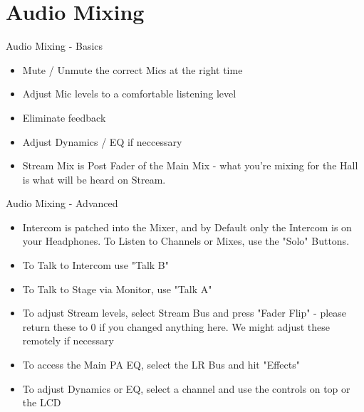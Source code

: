 \documentclass[aspectratio=169]{beamer}
\begin{document}
\section{Audio Mixing}

\begin{frame}{Audio Mixing - Basics}
	\begin{itemize}
		\item Mute / Unmute the correct Mics at the right time
		\item Adjust Mic levels to a comfortable listening level
		\item Eliminate feedback
		\item Adjust Dynamics / EQ if neccessary
		\item Stream Mix is Post Fader of the Main Mix - what you're mixing for the Hall is what will be heard on Stream.
	\end{itemize}
\end{frame}


\begin{frame}{Audio Mixing - Advanced}
	\begin{itemize}
		\item Intercom is patched into the Mixer, and by Default only the Intercom is on your Headphones. To Listen to Channels or Mixes, use the "Solo" Buttons.
		\item To Talk to Intercom use "Talk B"
		\item To Talk to Stage via Monitor, use "Talk A"
		\item To adjust Stream levels, select Stream Bus and press "Fader Flip" - please return these to 0 if you changed anything here. We might adjust these remotely if necessary
		\item To access the Main PA EQ, select the LR Bus and hit "Effects"
		\item To adjust Dynamics or EQ, select a channel and use the controls on top or the LCD
	\end{itemize}
\end{frame}
\end{document}
